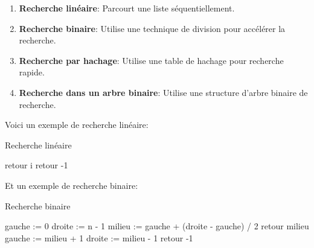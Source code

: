 \begin{enumerate}
	\item \textbf{Recherche linéaire}: Parcourt une liste séquentiellement.
	\item \textbf{Recherche binaire}: Utilise une technique de division pour accélérer la recherche.
	\item \textbf{Recherche par hachage}: Utilise une table de hachage pour recherche rapide.
	\item \textbf{Recherche dans un arbre binaire}: Utilise une structure d'arbre binaire de recherche.
\end{enumerate}

Voici un exemple de recherche linéaire:

\begin{algorithm}
	\caption{Recherche linéaire}
	\begin{algorithmic}[1]
		\State retour i
		\EndIf
		\EndFor
		\State retour -1
	\end{algorithmic}
\end{algorithm}

Et un exemple de recherche binaire:

\begin{algorithm}
	\caption{Recherche binaire}
	\begin{algorithmic}
		\State gauche := 0
		\State droite := n - 1
		\State milieu := gauche + (droite - gauche) / 2
		\State retour milieu
		\Else{}
		\State gauche := milieu + 1
		\Else
		\State droite := milieu - 1
		\EndIf
		\EndIf
		\EndWhile
		\State retour -1
	\end{algorithmic}
\end{algorithm}


